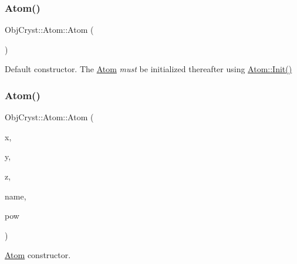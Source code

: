\subsubsection{\texorpdfstring{Atom()}{Atom()}\hspace{0.1cm}{\footnotesize\ttfamily [1/3]}}
{\footnotesize\ttfamily Obj\+Cryst\+::\+Atom\+::\+Atom (\begin{DoxyParamCaption}{ }\end{DoxyParamCaption})}

Default constructor. The \mbox{\hyperlink{class_obj_cryst_1_1_atom}{Atom}} {\itshape must} be initialized thereafter using \mbox{\hyperlink{class_obj_cryst_1_1_atom_ab05ef76113333041255789dba4bb60cd}{Atom\+::\+Init()}} \mbox{\label{class_obj_cryst_1_1_atom_a8f37e515c9e847ba20cc1033cd54e7b8}} 
\subsubsection{\texorpdfstring{Atom()}{Atom()}\hspace{0.1cm}{\footnotesize\ttfamily [2/3]}}
{\footnotesize\ttfamily Obj\+Cryst\+::\+Atom\+::\+Atom (\begin{DoxyParamCaption}\item[{const R\+E\+AL}]{x,  }\item[{const R\+E\+AL}]{y,  }\item[{const R\+E\+AL}]{z,  }\item[{const string \&}]{name,  }\item[{const \mbox{\hyperlink{class_obj_cryst_1_1_scattering_power}{Scattering\+Power}} $\ast$}]{pow }\end{DoxyParamCaption})}



\mbox{\hyperlink{class_obj_cryst_1_1_atom}{Atom}} constructor. 


